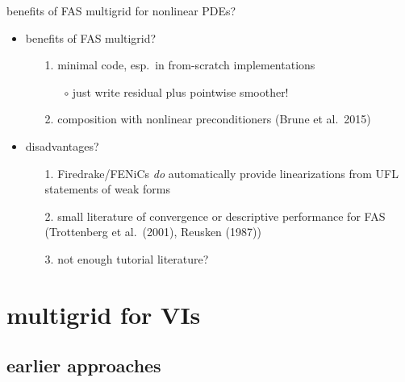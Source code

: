 \documentclass[svgnames,
               hyperref={colorlinks,citecolor=DeepPink4,linkcolor=FireBrick,urlcolor=Maroon},
               usepdftitle=false]  %
               {beamer}
\begin{document}
\begin{frame}{benefits of FAS multigrid for nonlinear PDEs?}

\begin{itemize}
\item \alert{benefits} of FAS multigrid?
    \begin{enumerate}
    \item[1.] minimal code, esp.~in from-scratch implementations
        \begin{itemize}
        \item[$\circ$] just write residual plus pointwise smoother!
        \end{itemize}
    \item[2.] composition with nonlinear preconditioners (Brune et al.~2015)
    \end{enumerate}

\bigskip
\item \alert{disadvantages?}
    \begin{enumerate}
    \item[1.] Firedrake/FENiCs \emph{do} automatically provide linearizations from UFL statements of weak forms
    \item[2.] small literature of convergence or descriptive performance for FAS (Trottenberg et al.~(2001), Reusken (1987))
    \item[3.] not enough tutorial literature?
    \end{enumerate}
\end{itemize}
\end{frame}


\section{multigrid for VIs}

\subsection{earlier approaches}
\end{document}
